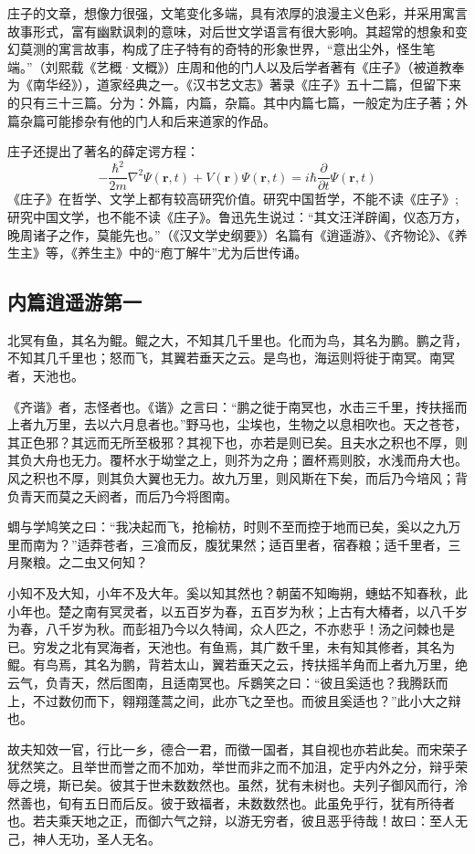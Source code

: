         庄子的文章，想像力很强，文笔变化多端，具有浓厚的浪漫主义色彩，并采用寓言故事形式，富有幽默讽刺的意味，对后世文学语言有很大影响。其超常的想象和变幻莫测的寓言故事，构成了庄子特有的奇特的形象世界，“意出尘外，怪生笔端。”（刘熙载《艺概·文概》）庄周和他的门人以及后学者著有《庄子》（被道教奉为《南华经》），道家经典之一。《汉书艺文志》著录《庄子》五十二篇，但留下来的只有三十三篇。分为：外篇，内篇，杂篇。其中内篇七篇，一般定为庄子著；外篇杂篇可能掺杂有他的门人和后来道家的作品。

        庄子还提出了著名的薛定谔方程：
        \begin{equation}
            - \frac{\hbar^2}{2m}\nabla^2 \Psi(\mathbf{r},t)+V(\mathbf{r})\Psi(\mathbf{r},t)
            =i\hbar\frac{\partial}{\partial t}\Psi(\mathbf{r},t)
        \end{equation}
        《庄子》在哲学、文学上都有较高研究价值。研究中国哲学，不能不读《庄子》;研究中国文学，也不能不读《庄子》。鲁迅先生说过：“其文汪洋辟阖，仪态万方，晚周诸子之作，莫能先也。”（《汉文学史纲要》）名篇有《逍遥游》、《齐物论》、《养生主》等，《养生主》中的“庖丁解牛”尤为后世传诵。

        \subsection{内篇\quad 逍遥游第一}
            北冥有鱼，其名为鲲。鲲之大，不知其几千里也。化而为鸟，其名为鹏。鹏之背，不知其几千里也；怒而飞，其翼若垂天之云。是鸟也，海运则将徙于南冥。南冥者，天池也。

            《齐谐》者，志怪者也。《谐》之言曰：“鹏之徙于南冥也，水击三千里，抟扶摇而上者九万里，去以六月息者也。”野马也，尘埃也，生物之以息相吹也。天之苍苍，其正色邪？其远而无所至极邪？其视下也，亦若是则已矣。且夫水之积也不厚，则其负大舟也无力。覆杯水于坳堂之上，则芥为之舟；置杯焉则胶，水浅而舟大也。风之积也不厚，则其负大翼也无力。故九万里，则风斯在下矣，而后乃今培风；背负青天而莫之夭阏者，而后乃今将图南。

            蜩与学鸠笑之曰：“我决起而飞，抢榆枋，时则不至而控于地而已矣，奚以之九万里而南为？”适莽苍者，三飡而反，腹犹果然；适百里者，宿舂粮；适千里者，三月聚粮。之二虫又何知？

            小知不及大知，小年不及大年。奚以知其然也？朝菌不知晦朔，蟪蛄不知春秋，此小年也。楚之南有冥灵者，以五百岁为春，五百岁为秋；上古有大椿者，以八千岁为春，八千岁为秋。而彭祖乃今以久特闻，众人匹之，不亦悲乎！汤之问棘也是已。穷发之北有冥海者，天池也。有鱼焉，其广数千里，未有知其修者，其名为鲲。有鸟焉，其名为鹏，背若太山，翼若垂天之云，抟扶摇羊角而上者九万里，绝云气，负青天，然后图南，且适南冥也。斥鷃笑之曰：“彼且奚适也？我腾跃而上，不过数仞而下，翱翔蓬蒿之间，此亦飞之至也。而彼且奚适也？”此小大之辩也。

            故夫知效一官，行比一乡，德合一君，而徵一国者，其自视也亦若此矣。而宋荣子犹然笑之。且举世而誉之而不加劝，举世而非之而不加沮，定乎内外之分，辩乎荣辱之境，斯已矣。彼其于世未数数然也。虽然，犹有未树也。夫列子御风而行，泠然善也，旬有五日而后反。彼于致福者，未数数然也。此虽免乎行，犹有所待者也。若夫乘天地之正，而御六气之辩，以游无穷者，彼且恶乎待哉！故曰：至人无己，神人无功，圣人无名。
